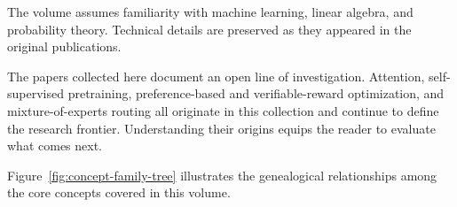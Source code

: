 The volume assumes familiarity with machine learning, linear algebra, and probability theory. Technical details are preserved as they appeared in the original publications.

The papers collected here document an open line of investigation. Attention, self-supervised pretraining, preference-based and verifiable-reward optimization, and mixture-of-experts routing all originate in this collection and continue to define the research frontier. Understanding their origins equips the reader to evaluate what comes next.

Figure~\ref{fig:concept-family-tree} illustrates the genealogical relationships among the core concepts covered in this volume.


